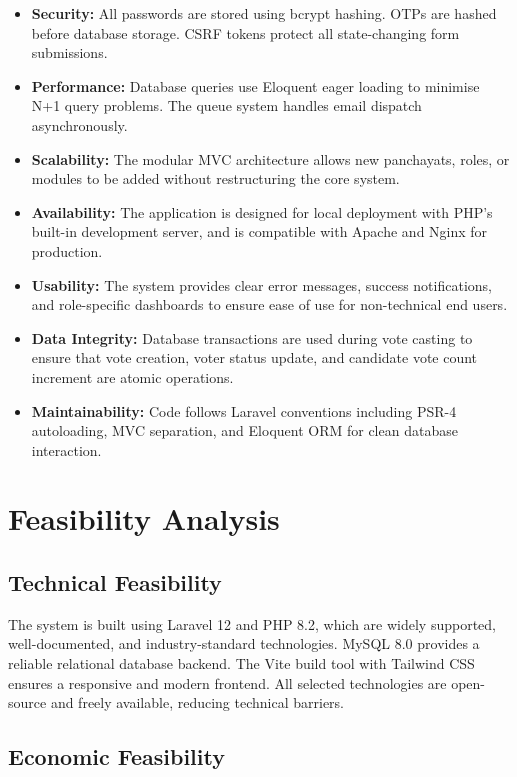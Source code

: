 \begin{itemize}
    \item \textbf{Security:} All passwords are stored using bcrypt hashing. OTPs are hashed before database storage. CSRF tokens protect all state-changing form submissions.
    \item \textbf{Performance:} Database queries use Eloquent eager loading to minimise N+1 query problems. The queue system handles email dispatch asynchronously.
    \item \textbf{Scalability:} The modular MVC architecture allows new panchayats, roles, or modules to be added without restructuring the core system.
    \item \textbf{Availability:} The application is designed for local deployment with PHP's built-in development server, and is compatible with Apache and Nginx for production.
    \item \textbf{Usability:} The system provides clear error messages, success notifications, and role-specific dashboards to ensure ease of use for non-technical end users.
    \item \textbf{Data Integrity:} Database transactions are used during vote casting to ensure that vote creation, voter status update, and candidate vote count increment are atomic operations.
    \item \textbf{Maintainability:} Code follows Laravel conventions including PSR-4 autoloading, MVC separation, and Eloquent ORM for clean database interaction.
\end{itemize}

\section{Feasibility Analysis}

\subsection{Technical Feasibility}

The system is built using Laravel 12 and PHP 8.2, which are widely supported, well-documented, and industry-standard technologies. MySQL 8.0 provides a reliable relational database backend. The Vite build tool with Tailwind CSS ensures a responsive and modern frontend. All selected technologies are open-source and freely available, reducing technical barriers.

\subsection{Economic Feasibility}

